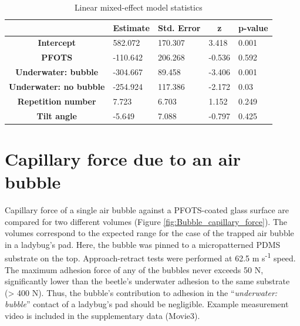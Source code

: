 \documentclass[english]{achemso}
\begin{document}
\begin{table}[]
\begin{tabular}{|c|l|l|l|l|}
\hline
\multicolumn{1}{|l|}{}           & \multicolumn{1}{c|}{\textbf{Estimate}} & \multicolumn{1}{c|}{\textbf{Std. Error}} & \multicolumn{1}{c|}{\textbf{z}} & \multicolumn{1}{c|}{\textbf{p-value}} \\ \hline \hline
\textbf{Intercept \footnotemark[1]}               & 582.072                                & 170.307                                  & 3.418                           & 0.001                                 \\ \hline
\textbf{PFOTS}                   & -110.642                               & 206.268                                  & -0.536                          & 0.592                                 \\ \hline
\textbf{Underwater:   bubble}    & -304.667                               & 89.458                                   & -3.406                          & 0.001                                 \\ \hline
\textbf{Underwater: no   bubble} & -254.924                               & 117.386                                  & -2.172                          & 0.03                                  \\ \hline
\textbf{Repetition   number}     & 7.723                                  & 6.703                                    & 1.152                           & 0.249                                 \\ \hline
\textbf{Tilt angle}              & -5.649                                 & 7.088                                    & -0.797                          & 0.425                                 \\ \hline
\end{tabular}
\caption{Linear mixed-effect model statistics\label{tab:LMEM-analysis}}
\end{table}



\section{Capillary force due to an air bubble\label{subsec:Capillary-force-due}}


Capillary force of a single air bubble against a PFOTS-coated glass surface are compared
for two different volumes (Figure \ref{fig:Bubble_capillary_force}). The volumes correspond to the expected
range for the case of the trapped air bubble in a ladybug's pad. Here, the bubble
was pinned to a micropatterned PDMS substrate on the top. Approach-retract tests were performed
at 62.5 \textmu m s\protect\textsuperscript{-1} speed. The maximum
adhesion force of any of the bubbles never exceeds 50 \textmu N,
significantly lower than the beetle's underwater adhesion to the same
substrate (> 400 \textmu N). Thus, the bubble's contribution
to adhesion in the ``\emph{underwater: bubble}'' contact of a ladybug's
pad should be negligible. Example measurement video is included in the supplementary data (Movie3).
\end{document}
